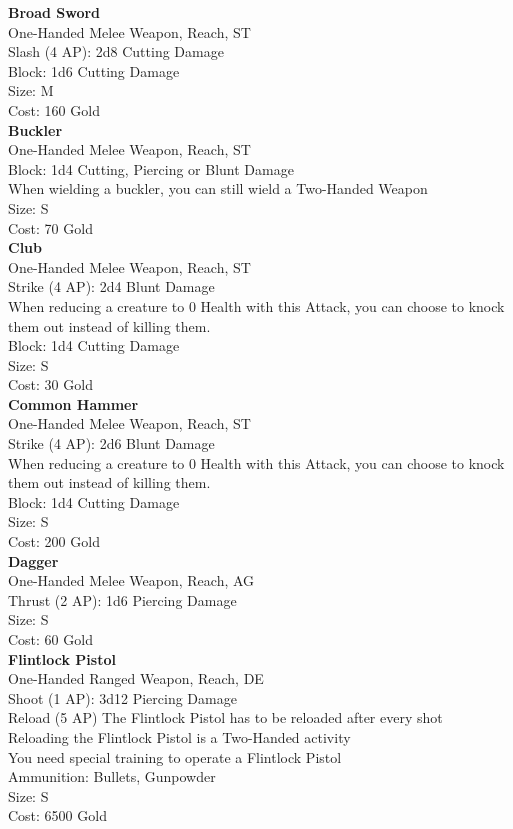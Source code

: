 \textbf{Broad Sword}\\
One-Handed Melee Weapon,  Reach, ST\\
Slash (4 AP): 2d8 Cutting Damage\\
Block: 1d6 Cutting Damage\\
Size: M\\
Cost: 160 Gold\\


\textbf{Buckler}\\
One-Handed Melee Weapon,  Reach, ST\\
Block: 1d4 Cutting, Piercing or Blunt Damage\\
When wielding a buckler, you can still wield a Two-Handed Weapon\\
Size: S\\
Cost: 70 Gold\\


\textbf{Club}\\
One-Handed Melee Weapon,  Reach, ST\\
Strike (4 AP): 2d4 Blunt Damage\\
When reducing a creature to 0 Health with this Attack, you can choose to knock them out instead of killing them.\\
Block: 1d4 Cutting Damage\\
Size: S\\
Cost: 30 Gold\\


\textbf{Common Hammer}\\
One-Handed Melee Weapon,  Reach, ST\\
Strike (4 AP): 2d6 Blunt Damage\\
When reducing a creature to 0 Health with this Attack, you can choose to knock them out instead of killing them.\\
Block: 1d4 Cutting Damage\\
Size: S\\
Cost: 200 Gold\\


\textbf{Dagger}\\
One-Handed Melee Weapon,  Reach, AG\\
Thrust (2 AP): 1d6 Piercing Damage\\
Size: S\\
Cost: 60 Gold\\


\textbf{Flintlock Pistol}\\
One-Handed Ranged Weapon,  Reach, DE\\
Shoot (1 AP): 3d12 Piercing Damage\\
Reload (5 AP) The Flintlock Pistol has to be reloaded after every shot\\
Reloading the Flintlock Pistol is a Two-Handed activity\\
You need special training to operate a Flintlock Pistol\\
Ammunition: Bullets, Gunpowder\\
Size: S\\
Cost: 6500 Gold\\



